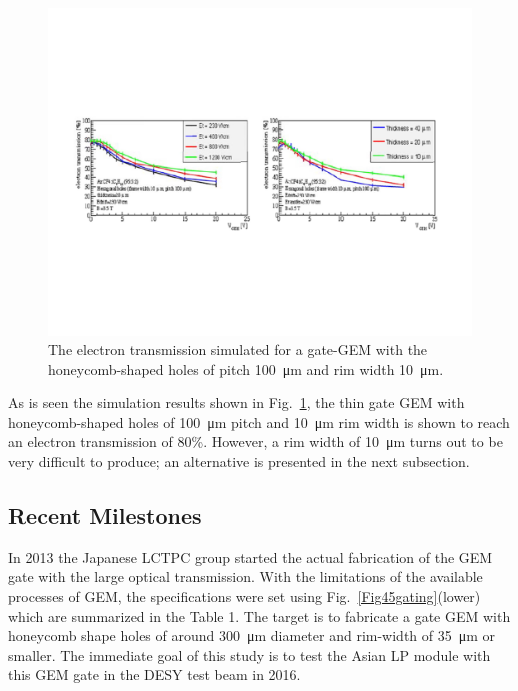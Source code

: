 \begin{figure}[htb!]
\begin{center}
\includegraphics[width=\columnwidth]{Tracker/TPC_Bonn/plots/TPC-Gate_Fig3gating.pdf}%
\caption{\label{Fig3gating} {The electron transmission simulated for a gate-GEM with the honeycomb-shaped holes of pitch \SI{100}{\micro m} and rim width \SI{10}{\micro m}.}}
\end{center}
\end{figure}

As is seen the simulation results shown in Fig.~\ref{Fig3gating}, the thin gate GEM with
honey\-comb-shaped holes of \SI{100}{\micro m} pitch and \SI{10}{\micro m} rim width is shown to reach
an electron transmission of 80\%. However, a rim width of \SI{10}{\micro m} turns out to be very difficult to produce;
an alternative is presented in the next subsection.

\subsection{Recent Milestones}

In 2013 the Japanese LCTPC group started the actual fabrication of the GEM gate with the large
optical transmission. With the limitations of the available processes of GEM, the specifications
were set using  Fig.~\ref{Fig45gating}(lower)
which are summarized in the Table 1. The target is to fabricate a gate GEM with  honeycomb shape holes
of around \SI{300}{\micro m} diameter and  rim-width of \SI{35}{\micro m} or smaller. The immediate goal
of this study is to test the Asian LP module with this GEM gate in the DESY test beam in 2016.

